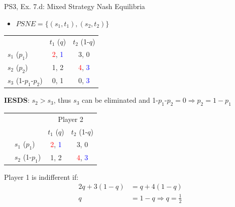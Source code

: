 \begin{frame}{PS3, Ex. 7.d: Mixed Strategy Nash Equilibria}
  \begin{multicols}{2}
    \begin{itemize}
      \item[(d)] $PSNE=\{(s_1,t_1),(s_2,t_2)\}$
    \end{itemize}
    \vspace{-10pt}
    \begin{table}
      \begin{tabular}{l|c|c|}
          \multicolumn{1}{c}{}  & \multicolumn{1}{c}{$t_1$ ($q$)} & \multicolumn{1}{c}{$t_2$ (1-$q$)} \\\cline{2-3}
          $s_1$ ($p_1$)         & \textcolor{red}{2}, \textcolor{blue}{1} & 3, 0 \\\cline{2-3}
          $s_2$ ($p_2$)         & 1, 2 & \textcolor{red}{4}, \textcolor{blue}{3} \\\cline{2-3}
          $s_3$ (1-$p_1$-$p_2$) & 0, 1 & 0, \textcolor{blue}{3} \\\cline{2-3}
      \end{tabular}
    \end{table}
    \vspace{-4pt}
    \textbf{IESDS}: $s_2>s_3$, thus $s_3$ can be eliminated and 1-$p_1$-$p_2=0\Rightarrow p_2=1-p_1$
    \vspace{-6pt}
    \begin{table}
      \begin{tabular}{cl|c|c|}
        & \multicolumn{1}{c}{} & \multicolumn{2}{c}{\color{blue}Player 2}\\
        \parbox[t]{1mm}{}
        &   &  &  \\
        & $s_1$ ($p_1$)  & \textcolor{red}{2}, \textcolor{blue}{1} & 3, 0 \\
        & $s_2$ (1-$p_1$)& 1, 2 & \textcolor{red}{4}, \textcolor{blue}{3} \\
      \end{tabular}
    \end{table}
    \vspace{-2pt}
    Player 1 is indifferent if:
    \vspace{-4pt}
    \begin{align*}
      2q+3(1-q) &= q+4(1-q) \\
      q &= 1-q \Rightarrow q = \frac{1}{2}

\end{align*}
\end{multicols}
\end{frame}
